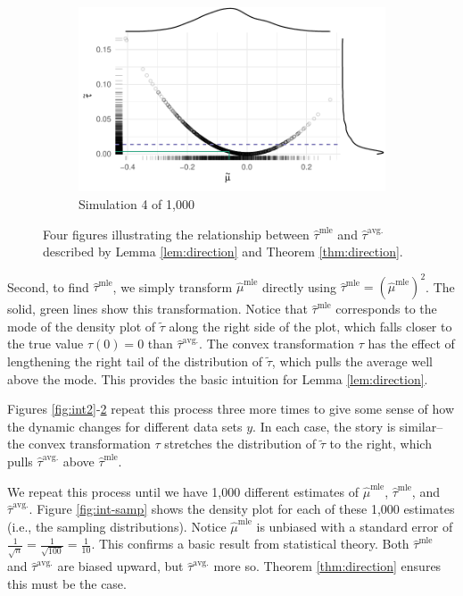 \documentclass[10pt]{article}
\begin{document}
\begin{figure}
\begin{subfigure}{.5\textwidth}
  \label{fig:int3}
\end{subfigure}%
\begin{subfigure}{.5\textwidth}
  \centering
  \includegraphics[width=.8\linewidth]{figs/intuition-4.pdf}
  \caption{Simulation 4 of 1,000}
  \label{fig:int4}
\end{subfigure}
\caption{Four figures illustrating the relationship between $\hat{\tau}^\text{mle}$ and $\hat{\tau}^\text{avg.}$ described by Lemma \ref{lem:direction} and Theorem \ref{thm:direction}.}
\label{fig:int}
\end{figure}

Second, to find $\hat{\tau}^\text{mle}$, we simply transform $\hat{\mu}^\text{mle}$ directly using $\hat{\tau}^\text{mle} = \left( \hat{\mu}^\text{mle} \right) ^2$. 
The solid, green lines show this transformation. 
Notice that $\hat{\tau}^\text{mle}$ corresponds to the mode of the density plot of $\tilde{\tau}$ along the right side of the plot, which falls closer to the true value $\tau(0) = 0$ than $\hat{\tau}^\text{avg.}$.
The convex transformation $\tau$ has the effect of lengthening the right tail of the distribution of $\tilde{\tau}$, which pulls the average well above the mode. 
This provides the basic intuition for Lemma \ref{lem:direction}.

Figures \ref{fig:int2}-\ref{fig:int4} repeat this process three more times to give some sense of how the dynamic changes for different data sets $y$.
In each case, the story is similar--the convex transformation $\tau$ stretches the distribution of $\tilde{\tau}$ to the right, which pulls $\hat{\tau}^\text{avg.}$ above $\hat{\tau}^\text{mle}$.

We repeat this process until we have 1,000 different estimates of $\hat{\mu}^\text{mle}$, $\hat{\tau}^\text{mle}$, and $\hat{\tau}^\text{avg.}$. 
Figure \ref{fig:int-samp} shows the density plot for each of these 1,000 estimates (i.e., the sampling distributions).
Notice $\hat{\mu}^\text{mle}$ is unbiased with a standard error of $\frac{1}{\sqrt{n}} = \frac{1}{\sqrt{100}} = \frac{1}{10}$.  
This confirms a basic result from statistical theory.
Both $\hat{\tau}^\text{mle}$ and $\hat{\tau}^\text{avg.}$ are biased upward, but $\hat{\tau}^\text{avg.}$ more so. 
Theorem \ref{thm:direction} ensures this must be the case. 
\end{document}
